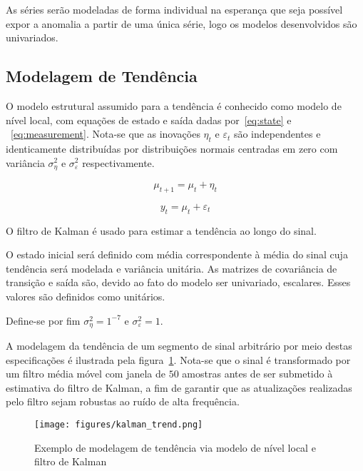 As séries serão modeladas de forma individual na esperança que seja possível
expor a anomalia a partir de uma única série, logo os modelos desenvolvidos
são univariados.

\subsection{Modelagem de Tendência}

O modelo estrutural assumido para a tendência é conhecido como modelo de nível
local, com equações de estado e saída dadas por~\ref{eq:state} e
~\ref{eq:measurement}. Nota-se que as inovações $\eta_t$ e $\varepsilon_t$ são
independentes e identicamente distribuídas por distribuições normais centradas
em zero com variância $\sigma^2_{\eta}$ e $\sigma^2_{\varepsilon}$
respectivamente.

\begin{equation}\label{eq:state}
    \mu_{t+1} = \mu_t + \eta_t
\end{equation}

\begin{equation}\label{eq:measurement}
    y_t = \mu_t + \varepsilon_t
\end{equation}

O filtro de Kalman é usado para estimar a tendência ao longo do sinal.

O estado inicial será definido com média correspondente à média do sinal cuja
tendência será modelada e variância unitária. As matrizes de covariância de
transição e saída são, devido ao fato do modelo ser univariado, escalares.
Esses valores são definidos como unitários.

Define-se por fim $\sigma^2_{\eta} = 1^{-7}$ e $\sigma^2_{\varepsilon} = 1$.

A modelagem da tendência de um segmento de sinal arbitrário por meio destas
especificações é ilustrada pela figura~\ref{fig:kalman_trend}. Nota-se
que o sinal é transformado por um filtro média móvel com janela de $50$
amostras antes de ser submetido à estimativa do filtro de Kalman, a fim de
garantir que as atualizações realizadas pelo filtro sejam robustas ao ruído
de alta frequência.

\begin{figure}[H]
    \centering
    \texttt{[image: figures/kalman\_trend.png]}
    \caption{Exemplo de modelagem de tendência via modelo de nível local e
    filtro de Kalman}
    \label{fig:kalman_trend}
\end{figure}

